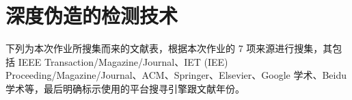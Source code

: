 \chapter{深度伪造的检测技术}
\label{chap:4}

下列为本次作业所搜集而来的文献表，根据本次作业的 7 项来源进行搜集，其包括 IEEE Transaction/Magazine/Journal、IET (IEE) Proceeding/Magazine/Journal、ACM、Springer、Elsevier、Google 学术、Beidu 学术等，最后明确标示使用的平台搜寻引擎跟文献年份。



